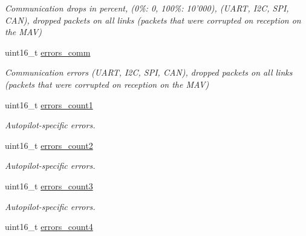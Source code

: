 \begin{DoxyCompactItemize}
\begin{DoxyCompactList}\small\item\em Communication drops in percent, (0\%\+: 0, 100\%\+: 10'000), (U\+A\+R\+T, I2\+C, S\+P\+I, C\+A\+N), dropped packets on all links (packets that were corrupted on reception on the M\+A\+V) \end{DoxyCompactList}\item 
\hypertarget{struct____mavlink__sys__status__t_af144d0a152da70babf5ec86593e88700}{uint16\+\_\+t \hyperlink{struct____mavlink__sys__status__t_af144d0a152da70babf5ec86593e88700}{errors\+\_\+comm}}\label{struct____mavlink__sys__status__t_af144d0a152da70babf5ec86593e88700}

\begin{DoxyCompactList}\small\item\em Communication errors (U\+A\+R\+T, I2\+C, S\+P\+I, C\+A\+N), dropped packets on all links (packets that were corrupted on reception on the M\+A\+V) \end{DoxyCompactList}\item 
\hypertarget{struct____mavlink__sys__status__t_a11e2c7144a8d17da05c2f070d919bfc5}{uint16\+\_\+t \hyperlink{struct____mavlink__sys__status__t_a11e2c7144a8d17da05c2f070d919bfc5}{errors\+\_\+count1}}\label{struct____mavlink__sys__status__t_a11e2c7144a8d17da05c2f070d919bfc5}

\begin{DoxyCompactList}\small\item\em Autopilot-\/specific errors. \end{DoxyCompactList}\item 
\hypertarget{struct____mavlink__sys__status__t_a5a67792e19997897a415af3b4dba3d68}{uint16\+\_\+t \hyperlink{struct____mavlink__sys__status__t_a5a67792e19997897a415af3b4dba3d68}{errors\+\_\+count2}}\label{struct____mavlink__sys__status__t_a5a67792e19997897a415af3b4dba3d68}

\begin{DoxyCompactList}\small\item\em Autopilot-\/specific errors. \end{DoxyCompactList}\item 
\hypertarget{struct____mavlink__sys__status__t_aafca91f6177e4d0ed71410ac5b8f4ac8}{uint16\+\_\+t \hyperlink{struct____mavlink__sys__status__t_aafca91f6177e4d0ed71410ac5b8f4ac8}{errors\+\_\+count3}}\label{struct____mavlink__sys__status__t_aafca91f6177e4d0ed71410ac5b8f4ac8}

\begin{DoxyCompactList}\small\item\em Autopilot-\/specific errors. \end{DoxyCompactList}\item 
\hypertarget{struct____mavlink__sys__status__t_a05303107ce28241b401f6383e6d6e634}{uint16\+\_\+t \hyperlink{struct____mavlink__sys__status__t_a05303107ce28241b401f6383e6d6e634}{errors\+\_\+count4}}\label{struct____mavlink__sys__status__t_a05303107ce28241b401f6383e6d6e634}


\end{DoxyCompactItemize}
